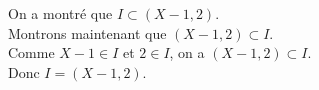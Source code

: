 {\begin{td-sol}[]
\begin{enumerate}
            On a montré que \(I\subset (X-1,2)\).\\
            Montrons maintenant que \((X-1,2)\subset I\).\\
            Comme \(X-1\in I\) et \(2\in I\), on a \((X-1,2)\subset I\).\\
            Donc \(I = (X-1,2)\).

        \end{enumerate}
    \end{td-sol}
}{}




% 
